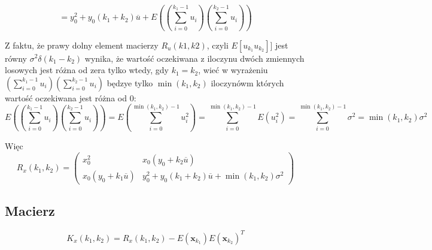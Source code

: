 \documentclass[10pt,a4paper]{article}
\begin{document}
\begin{equation}
     =y_0^2 + y_0(k_1+k_2) \overline{u}+ E \left( \left( \sum \limits_{i=0}^{k_1-1} u_i \right) \left( \sum \limits_{i=0}^{k_2-1} u_i \right) \right)
\end{equation}	

Z faktu, że prawy dolny element macierzy $R_u(k1, k2)$, czyli $ E[u_{k_1}u_{k_2}]]$ jest równy
$\sigma^2 \delta(k_1-k_2)$ wynika, że wartość oczekiwana z iloczynu dwóch zmiennych losowych jest różna od zera tylko wtedy, gdy $k_1 = k_2$, wieć w wyrażeniu $ \left( \sum \limits_{i=0}^{k_1-1} u_i \right) \left( \sum \limits_{i=0}^{k_2-1} u_i \right) $ będzye tylko $\min(k_1, k_2)$ iloczynówm których wartość oczekiwana jest różna od 0:
\begin{equation}
E\left( \left( \sum \limits_{i=0}^{k_1-1} u_i \right) \left( \sum \limits_{i=0}^{k_2-1} u_i \right) \right) = 
E\left( \sum \limits_{i=0}^{ \min(k_1, k_2) -1}  u_i^2 \right) = 	
\sum \limits_{i=0}^{ \min(k_1, k_2) -1} E\left(  u_i^2 \right) = 
\sum \limits_{i=0}^{ \min(k_1, k_2) -1} \sigma ^2 = \min( k_1, k_2 ) \sigma^2  
\end{equation}

Więc
\begin{equation}
R_x(k_1, k_2) =
\left( 
		\begin{matrix}
			x_{0}^2 & x_0(y_{0} + k_2 \overline{u} ) \\
			x_0(y_{0} + k_1 \overline{u}) & y_0^2 + y_0(k_1+k_2) \overline{u}+\min( k_1, k_2 ) \sigma^2
		\end{matrix}			
	\right)
\end{equation}

\subsection*{Macierz}
\begin{equation}
K_x(k_1, k_2) = R_x(k_1, k_2) - E \left( \textbf{x}_{k_1} \right) E \left( \textbf{x}_{k_2} \right) ^T
\end{equation}
\end{document}
